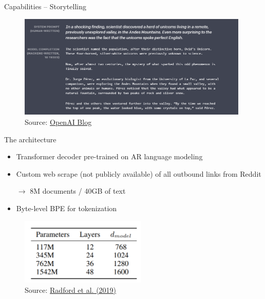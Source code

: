 \begin{frame}{Capabilities -- Storytelling}

\vfill

\begin{figure}
\centering
\includegraphics[width = 11cm]{figure/72-gpt2-story.png}\\ 
\footnotesize{Source:} \href{https://openai.com/blog/better-language-models/\#sample1}{\footnotesize OpenAI Blog}
\end{figure}

\vfill

\end{frame}


\begin{frame}{The architecture}

\vfill

\begin{itemize}
	\item Transformer decoder pre-trained on AR language modeling
	\item Custom web scrape (not publicly available) of all outbound links from Reddit
	\item[$\to$] 8M documents / 40GB of text
	\item Byte-level BPE for tokenization
\end{itemize}

\begin{figure}
\centering
\includegraphics[width = 6cm]{figure/72-gpt2-size.png}\\ 
\footnotesize{Source:} \href{https://cdn.openai.com/better-language-models/language_models_are_unsupervised_multitask_learners.pdf}{\footnotesize Radford et al. (2019)}
\end{figure}

\vfill

\end{frame}

